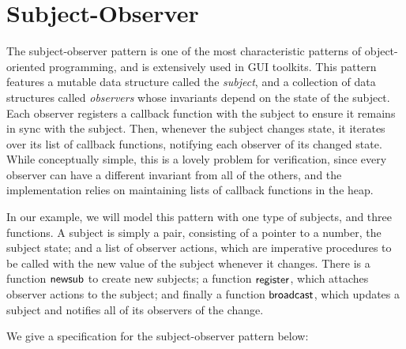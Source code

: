 \section{Subject-Observer}

The subject-observer pattern is one of the most characteristic
patterns of object-oriented programming, and is extensively used in
GUI toolkits. This pattern features a mutable data structure called
the \emph{subject}, and a collection of data structures called
\emph{observers} whose invariants depend on the state of the
subject. Each observer registers a callback function with the subject
to ensure it remains in sync with the subject. Then, whenever the
subject changes state, it iterates over its list of callback
functions, notifying each observer of its changed state. While
conceptually simple, this is a lovely problem for verification, since
every observer can have a different invariant from all of the others,
and the implementation relies on maintaining lists of callback
functions in the heap.  

In our example, we will model this pattern with one type of subjects,
and three functions. A subject is simply a pair, consisting of a
pointer to a number, the subject state; and a list of observer
actions, which are imperative procedures to be called with the new
value of the subject whenever it changes. There is a function
$\mathsf{newsub}$ to create new subjects; a function
$\mathsf{register}$, which attaches observer actions to the subject;
and finally a function $\mathsf{broadcast}$, which updates a subject
and notifies all of its observers of the change. 


We give a specification for the subject-observer pattern below:
%


